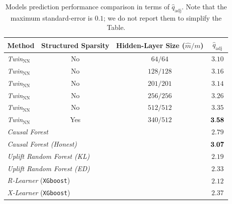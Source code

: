 \documentclass{article}
\def\qadj{\hat{q}_{\mathrm{adj}}}
\begin{document}
\begin{table}[!ht]
    \centering
    \begin{tabular}{lccc}
        \hline
        Method & Structured Sparsity & Hidden-Layer Size ($\hat m/m$) & $\qadj$ \\
        \hline
        {\it Twin$_{\mathrm{NN}}$} & No & $64/64$   &  $3.10$\\
        {\it Twin$_{\mathrm{NN}}$} & No & $128/128$ &  $3.16$\\
        {\it Twin$_{\mathrm{NN}}$} & No & $201/201$ &  $3.14$\\
        {\it Twin$_{\mathrm{NN}}$} & No & $256/256$ &  $3.26$\\
        {\it Twin$_{\mathrm{NN}}$} & No & $512/512$ &  $3.35$\\
        {\it Twin$_{\mathrm{NN}}$} & Yes & $340/512$ & $\bf 3.58$\\
        \hline
        \multicolumn{3}{l}{{\it Causal Forest}}& $2.79$ \\
        \multicolumn{3}{l}{{\it Causal Forest (Honest)}}& $\bf 3.07$\\
        \multicolumn{3}{l}{{\it Uplift Random Forest (KL)}}&$2.19$\\
        \multicolumn{3}{l}{{\it Uplift Random Forest (ED)}}& $2.33$ \\
        \multicolumn{3}{l}{{\it R-Learner }(\texttt{XGboost})}& $2.12$\\
        \multicolumn{3}{l}{{\it X-Learner }(\texttt{XGboost})}& $2.37$ \\
       \hline
    \end{tabular}
    \vspace{2mm}
    \caption{Models prediction performance comparison in terms of $\qadj$. Note that the maximum standard-error is $0.1$; we do not report them to simplify the Table.}
    \label{tab:beyond_linearity_results_}
\end{table}
\end{document}
